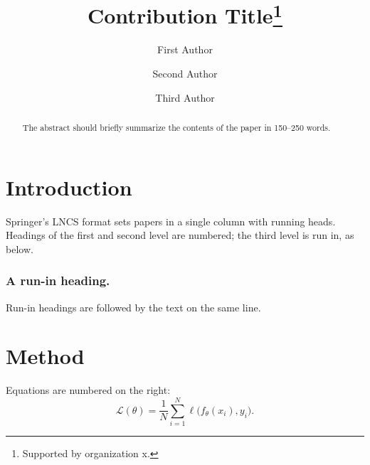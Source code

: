 \documentclass[runningheads]{llncs}
\begin{document}
\title{Contribution Title\thanks{Supported by organization x.}}

\author{First Author \and
Second Author \and
Third Author}


\maketitle

\begin{abstract}
The abstract should briefly summarize the contents of the paper in 150--250 words.

\end{abstract}

\section{Introduction}
Springer's LNCS format sets papers in a single column with running heads. Headings of the
first and second level are numbered; the third level is run in, as below.

\subsubsection{A run-in heading.}
Run-in headings are followed by the text on the same line.

\section{Method}
Equations are numbered on the right:
\begin{equation}
  \mathcal{L}(\theta) = \frac{1}{N} \sum_{i=1}^{N} \ell\bigl(f_\theta(x_i), y_i\bigr).
\end{equation}
\end{document}
